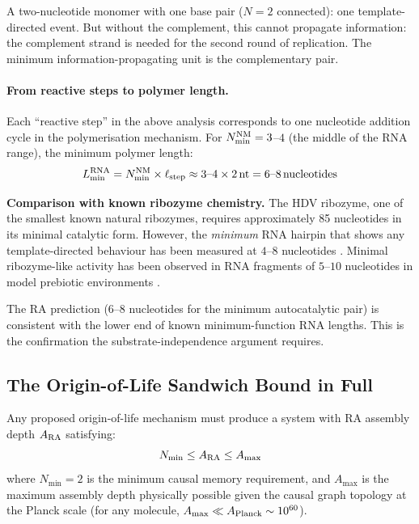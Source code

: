 \documentclass[12pt,a4paper]{article}
\begin{document}
A two-nucleotide monomer with one base pair ($N=2$ connected): one template-directed event.  But without the complement, this cannot propagate information: the complement strand is needed for the second round of replication.  The minimum information-propagating unit is the complementary pair.

\paragraph{From reactive steps to polymer length.}
Each ``reactive step'' in the above analysis corresponds to one nucleotide addition cycle in the polymerisation mechanism.  For $N_{\min}^{\rm NM}=3$--$4$ (the middle of the RNA range), the minimum polymer length:
\begin{equation}
  L_{\min}^{\rm RNA} = N_{\min}^{\rm NM}\times\ell_{\rm step} \approx 3\text{--}4\times2\,\mathrm{nt} = 6\text{--}8\,\mathrm{nucleotides}
\end{equation}

\textbf{Comparison with known ribozyme chemistry.}  The HDV ribozyme, one of the smallest known natural ribozymes, requires approximately 85 nucleotides in its minimal catalytic form.  However, the \emph{minimum} RNA hairpin that shows any template-directed behaviour has been measured at $4$--$8$ nucleotides \cite{Turk2010}.  Minimal ribozyme-like activity has been observed in RNA fragments of $5$--$10$ nucleotides in model prebiotic environments \cite{Joyce2018}.

The RA prediction ($6$--$8$ nucleotides for the minimum autocatalytic pair) is consistent with the lower end of known minimum-function RNA lengths.  This is the confirmation the substrate-independence argument requires.

\subsection{The Origin-of-Life Sandwich Bound in Full}

Any proposed origin-of-life mechanism must produce a system with RA assembly depth $A_{\rm RA}$ satisfying:
\begin{equation}
  N_{\min} \leq A_{\rm RA} \leq A_{\max}
  \label{eq:sandwich_full}
\end{equation}
where $N_{\min}=2$ is the minimum causal memory requirement, and $A_{\max}$ is the maximum assembly depth physically possible given the causal graph topology at the Planck scale (for any molecule, $A_{\max}\ll A_{\rm Planck}\sim10^{60}$).
\end{document}
